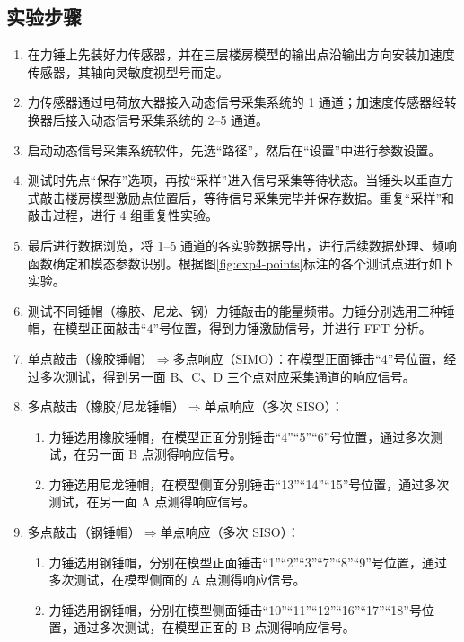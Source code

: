 \documentclass[UTF8,a4paper,12pt]{ctexart}
\numberwithin{equation}{section}
\begin{document}
\subsection{实验步骤}
\begin{enumerate}
  \item 在力锤上先装好力传感器，并在三层楼房模型的输出点沿输出方向安装加速度传感器，其轴向灵敏度视型号而定。
  \item 力传感器通过电荷放大器接入动态信号采集系统的 1 通道；加速度传感器经转换器后接入动态信号采集系统的 2--5 通道。
  \item 启动动态信号采集系统软件，先选“路径”，然后在“设置”中进行参数设置。
  \item 测试时先点“保存”选项，再按“采样”进入信号采集等待状态。当锤头以垂直方式敲击楼房模型激励点位置后，等待信号采集完毕并保存数据。重复“采样”和敲击过程，进行 4 组重复性实验。
  \item 最后进行数据浏览，将 1--5 通道的各实验数据导出，进行后续数据处理、频响函数确定和模态参数识别。根据图\ref{fig:exp4-points}标注的各个测试点进行如下实验。
  \item 测试不同锤帽（橡胶、尼龙、钢）力锤敲击的能量频带。力锤分别选用三种锤帽，在模型正面敲击“4”号位置，得到力锤激励信号，并进行 FFT 分析。
  \item 单点敲击（橡胶锤帽）$\Rightarrow$多点响应（SIMO）：在模型正面锤击“4”号位置，经过多次测试，得到另一面 B、C、D 三个点对应采集通道的响应信号。
  \item 多点敲击（橡胶/尼龙锤帽）$\Rightarrow$单点响应（多次 SISO）：
  \begin{enumerate}[label=\alph*)]
    \item 力锤选用橡胶锤帽，在模型正面分别锤击“4”“5”“6”号位置，通过多次测试，在另一面 B 点测得响应信号。
    \item 力锤选用尼龙锤帽，在模型侧面分别锤击“13”“14”“15”号位置，通过多次测试，在另一面 A 点测得响应信号。
  \end{enumerate}
  \item 多点敲击（钢锤帽）$\Rightarrow$单点响应（多次 SISO）：
  \begin{enumerate}[label=\alph*)]
    \item 力锤选用钢锤帽，分别在模型正面锤击“1”“2”“3”“7”“8”“9”号位置，通过多次测试，在模型侧面的 A 点测得响应信号。
    \item 力锤选用钢锤帽，分别在模型侧面锤击“10”“11”“12”“16”“17”“18”号位置，通过多次测试，在模型正面的 B 点测得响应信号。
  \end{enumerate}
\end{enumerate}
\end{document}
